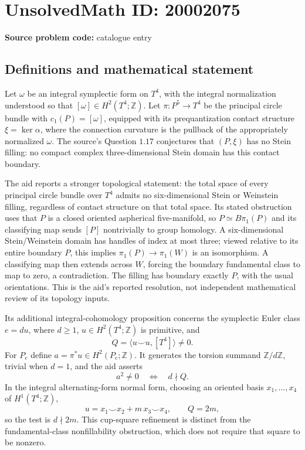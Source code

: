 \documentclass[11pt]{article}
\newcommand{\Z}{\mathbb{Z}}
\begin{document}
\section*{UnsolvedMath ID: 20002075}
\textbf{Source problem code:} catalogue entry
\subsection{Definitions and mathematical statement}
Let \(\omega\) be an integral symplectic form on \(T^4\), with the integral normalization understood so that \([\omega]\in H^2(T^4;\Z)\). Let \(\pi:P^5\to T^4\) be the principal circle bundle with \(c_1(P)=[\omega]\), equipped with its prequantization contact structure \(\xi=\ker\alpha\), where the connection curvature is the pullback of the appropriately normalized \(\omega\). The source's Question \(1.17\) conjectures that \((P,\xi)\) has no Stein filling: no compact complex three-dimensional Stein domain has this contact boundary.

The aid reports a stronger topological statement: the total space of every principal circle bundle over \(T^4\) admits no six-dimensional Stein or Weinstein filling, regardless of contact structure on that total space. Its stated obstruction uses that \(P\) is a closed oriented aspherical five-manifold, so \(P\simeq B\pi_1(P)\) and its classifying map sends \([P]\) nontrivially to group homology. A six-dimensional Stein/Weinstein domain has handles of index at most three; viewed relative to its entire boundary \(P\), this implies \(\pi_1(P)\to\pi_1(W)\) is an isomorphism. A classifying map then extends across \(W\), forcing the boundary fundamental class to map to zero, a contradiction. The filling has boundary exactly \(P\), with the usual orientations. This is the aid's reported resolution, not independent mathematical review of its topology inputs.

Its additional integral-cohomology proposition concerns the symplectic Euler class \(e=du\), where \(d\geq1\), \(u\in H^2(T^4;\Z)\) is primitive, and
\[
 Q=\langle u\smile u,[T^4]\rangle\ne0.
\]
For \(P_e\) define \(a=\pi^*u\in H^2(P_e;\Z)\). It generates the torsion summand \(\Z/d\Z\), trivial when \(d=1\), and the aid asserts
\[
 a^2\ne0\quad\Longleftrightarrow\quad d\nmid Q.
\]
In the integral alternating-form normal form, choosing an oriented basis \(x_1,\ldots,x_4\) of \(H^1(T^4;\Z)\),
\[
 u=x_1\smile x_2+m\,x_3\smile x_4,\qquad Q=2m,
\]
so the test is \(d\nmid2m\). This cup-square refinement is distinct from the fundamental-class nonfillability obstruction, which does not require that square to be nonzero.
\end{document}
